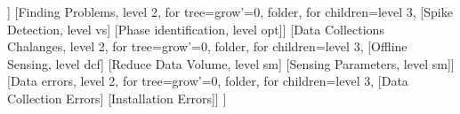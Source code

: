 \documentclass[tikz,border=10pt]{standalone}
\begin{document}
	\begin{forest}
	[Chalanges, root
	[Electrical System Complaxity, 
	level 2, for tree={grow'=0,  folder}, 
	for children={level 3},
		[Similar Appliances, level vs]
		[Large Number of Appliance, level opt]]
	[Finding Problems, 
		level 2, for tree={grow'=0,  folder}, 
		for children={level 3},
			[Spike Detection, level vs]
			[Phase identification, level opt]]
		[Data Collections \\Chalanges, 
	level 2, for tree={grow'=0,  folder}, 
	for children={level 3},
		[Offline Sensing, level dcf]
		[Reduce Data Volume, level sm]
		[Sensing Parameters, level sm]]
	[Data errors, 
	level 2, for tree={grow'=0, folder}, 
		for children={level 3},
		[Data Collection Errors]
		[Installation Errors]]
	]
	\end{forest}
\end{document}
